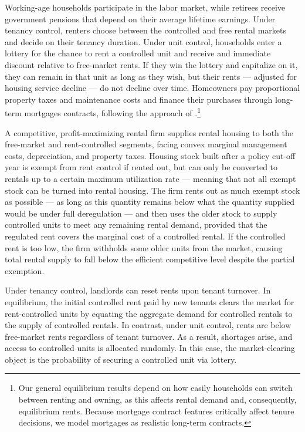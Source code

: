 \documentclass[parskip=full]{article}
\begin{document}
Working-age households participate in the labor market, while retirees receive government pensions that depend on their average lifetime earnings. Under tenancy control, renters choose between the controlled and free rental markets and decide on their tenancy duration. Under unit control, households enter a lottery for the chance to rent a controlled unit and receive and immediate discount relative to free-market rents. If they win the lottery and capitalize on it, they can remain in that unit as long as they wish, but their rents — adjusted for housing service decline — do not decline over time. Homeowners pay proportional property taxes and maintenance costs and finance their purchases through long-term mortgages contracts, following the approach of \citet{kkk-2021}.\footnote{Our general equilibrium results depend on how easily households can switch between renting and owning, as this affects rental demand and, consequently, equilibrium rents. Because mortgage contract features critically affect tenure decisions, we model mortgages as realistic long-term contracts.} 

A competitive, profit-maximizing rental firm supplies rental housing to both the free-market and rent-controlled segments, facing convex marginal management costs, depreciation, and property taxes. Housing stock built after a policy cut-off year is exempt from rent control if rented out, but can only be converted to rentals up to a certain maximum utilization rate — meaning that not all exempt stock can be turned into rental housing. The firm rents out as much exempt stock as possible — as long as this quantity remains below what the quantity supplied would be under full deregulation — and then uses the older stock to supply controlled units to meet any remaining rental demand, provided that the regulated rent covers the marginal cost of a controlled rental. If the controlled rent is too low, the firm withholds some older units from the market, causing total rental supply to fall below the efficient competitive level despite the partial exemption.

Under tenancy control, landlords can reset rents upon tenant turnover. In equilibrium, the initial controlled rent paid by new tenants clears the market for rent-controlled units by equating the aggregate demand for controlled rentals to the supply of controlled rentals. In contrast, under unit control, rents are below free-market rents regardless of tenant turnover. As a result, shortages arise, and access to controlled units is allocated randomly. In this case, the market-clearing object is the probability of securing a controlled unit via lottery.
\end{document}
